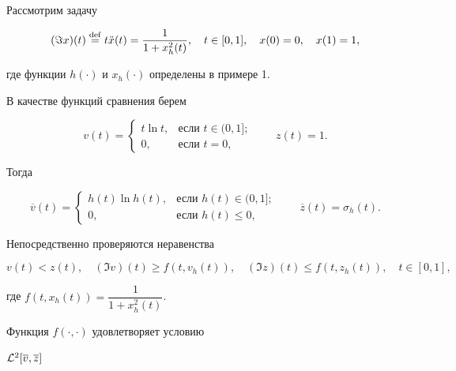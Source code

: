 \begin{exam} Рассмотрим задачу


\begin{equation}


({\Im}x)(t)\overset{\mathrm{def}}{=}{}


t \Ddot{x} (t)=\frac{1}{1+x_h^2(t)}, \quad


t\in [0,1],\quad x(0)=0, \quad x(1)=1,


\end{equation}


где функции $h(\cdot)$ и $x_h(\cdot)$ определены в примере 1.


В качестве функций сравнения берем


$$


v(t)=


\begin{cases}


t\ln t, & \text{если } t\in (0,1]; \\


0, & \text{если } t=0,


\end{cases}


\qquad z(t)=1.


$$


Тогда


$$


\overline {v}(t)=


\begin{cases}


h(t)\ln h(t), & \text{если } h(t)\in (0,1]; \\


0, & \text{если } h(t)\le 0,


\end{cases}


\qquad \overline {z}(t)=\sigma_h(t).


$$


Непосредственно проверяются неравенства


$$


v(t)< z(t), \quad


(\Im v)(t)\ge f(t,v_h(t)), \quad


(\Im z)(t)\le f(t,z_h(t)), \quad


t\in[0,1],


$$


где $f(t,x_h(t))=\dfrac{1}{1+x_h^2(t)}$.


Функция $f(\cdot,\cdot)$ удовлетворяет условию


${\cal L}^2[\overline {v},\overline {z}]$



\end{exam}

